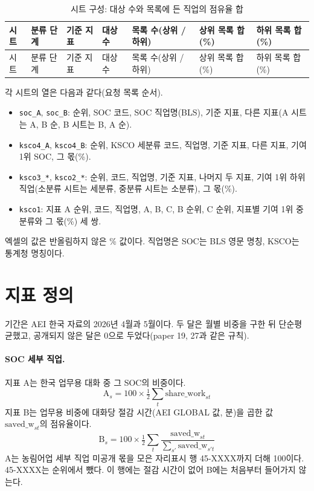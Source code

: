 \documentclass[11pt]{article}
\begin{document}
\begin{small}
\begin{longtable}{L{1.6cm}L{2.6cm}L{1.2cm}R{1.3cm}R{1.3cm}R{2.3cm}R{2.3cm}}
\caption{시트 구성: 대상 수와 목록에 든 직업의 점유율 합}\label{tab:sheets}\\
\toprule
시트 & 분류 단계 & 기준 지표 & 대상 수 & 목록 수(상위 / 하위) & 상위 목록 합(\%) & 하위 목록 합(\%) \\
\midrule
\endfirsthead
\toprule
시트 & 분류 단계 & 기준 지표 & 대상 수 & 목록 수(상위 / 하위) & 상위 목록 합(\%) & 하위 목록 합(\%) \\
\midrule
\endhead

\bottomrule
\end{longtable}
\end{small}

각 시트의 열은 다음과 같다(요청 목록 순서).
\begin{itemize}[leftmargin=*]
  \item \texttt{soc\_A}, \texttt{soc\_B}: 순위, SOC 코드, SOC 직업명(BLS), 기준 지표, 다른 지표(A 시트는 A, B 순, B 시트는 B, A 순).
  \item \texttt{ksco4\_A}, \texttt{ksco4\_B}: 순위, KSCO 세분류 코드, 직업명, 기준 지표, 다른 지표, 기여 1위 SOC, 그 몫(\%).
  \item \texttt{ksco3\_*}, \texttt{ksco2\_*}: 순위, 코드, 직업명, 기준 지표, 나머지 두 지표, 기여 1위 하위 직업(소분류 시트는 세분류, 중분류 시트는 소분류), 그 몫(\%).
  \item \texttt{ksco1}: 지표 A 순위, 코드, 직업명, A, B, C, B 순위, C 순위, 지표별 기여 1위 중분류와 그 몫(\%) 세 쌍.
\end{itemize}
엑셀의 값은 반올림하지 않은 \% 값이다. 직업명은 SOC는 BLS 영문 명칭, KSCO는 통계청 명칭이다.

\section{지표 정의}

기간은 AEI 한국 자료의 2026년 4월과 5월이다. 두 달은 월별 비중을 구한 뒤 단순평균했고, 공개되지 않은 달은 0으로 두었다(paper 19, 27과 같은 규칙).

\paragraph{SOC 세부 직업.} 지표 A는 한국 업무용 대화 중 그 SOC의 비중이다.
\[
\text{A}_s = 100 \times \tfrac{1}{2} \sum_t \text{share\_work}_{st}
\]
지표 B는 업무용 비중에 대화당 절감 시간(AEI GLOBAL 값, 분)을 곱한 값 $\text{saved\_w}_{st}$의 점유율이다.
\[
\text{B}_s = 100 \times \tfrac{1}{2} \sum_t \frac{\text{saved\_w}_{st}}{\sum_{s'} \text{saved\_w}_{s't}}
\]
A는 농림어업 세부 직업 미공개 몫을 모은 자리표시 행 45-XXXX까지 더해 100이다. 45-XXXX는 순위에서 뺐다. 이 행에는 절감 시간이 없어 B에는 처음부터 들어가지 않는다.
\end{document}
